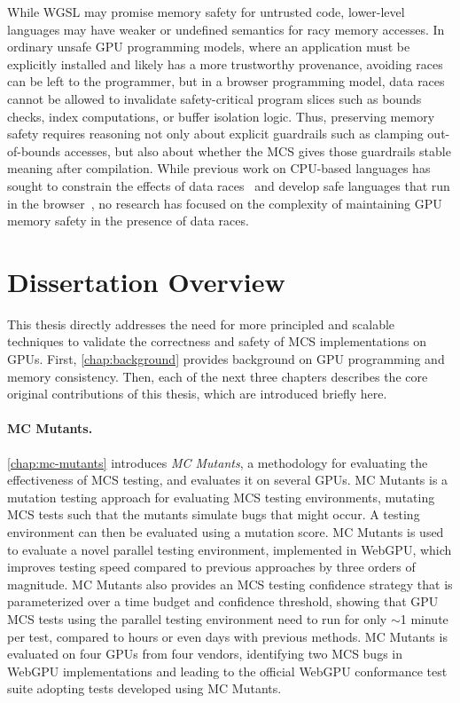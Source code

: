 While WGSL may promise memory safety for untrusted code, lower-level languages may have weaker or undefined semantics for racy memory accesses. In ordinary unsafe GPU programming models, where an application must be explicitly installed and likely has a more trustworthy provenance, avoiding races can be left to the programmer, but in a browser programming model, data races cannot be allowed to invalidate safety-critical program slices such as bounds checks, index computations, or buffer isolation logic. Thus, preserving memory safety requires reasoning not only about explicit guardrails such as clamping out-of-bounds accesses, but also about whether the MCS gives those guardrails stable meaning after compilation. While previous work on CPU-based languages has sought to constrain the effects of data races~\cite{dolan2018bounding} and develop safe languages that run in the browser~\cite{watt2020repairing,watt2019weakening}, no research has focused on the complexity of maintaining GPU memory safety in the presence of data races.

\section{Dissertation Overview}
\label{sec:intro-contrib}

This thesis directly addresses the need for more principled and scalable techniques to validate the correctness and safety of MCS implementations on GPUs. First, \mychaplong\ref{chap:background} provides background on GPU programming and memory consistency. Then, each of the next three chapters describes the core original contributions of this thesis, which are introduced briefly here.

\paragraph{MC Mutants.}  \mychaplong\ref{chap:mc-mutants} introduces \textit{MC Mutants}, a methodology for evaluating the effectiveness of MCS testing, and evaluates it on several GPUs. MC Mutants is a mutation testing approach for evaluating MCS testing environments, mutating MCS tests such that the mutants simulate bugs that might occur. A testing environment can then be evaluated using a mutation score. MC Mutants is used to evaluate a novel parallel testing environment, implemented in WebGPU, which improves testing speed compared to previous approaches by three orders of magnitude. MC Mutants also provides an MCS testing confidence strategy that is parameterized over a time budget and confidence threshold, showing that GPU MCS tests using the parallel testing environment need to run for only $\sim$1 minute per test, compared to hours or even days with previous methods. MC Mutants is evaluated on four GPUs from four vendors, identifying two MCS bugs in WebGPU implementations and leading to the official WebGPU conformance test suite adopting tests developed using MC Mutants.

